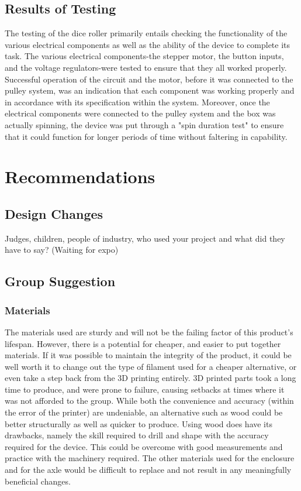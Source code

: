 \documentclass[12pt]{article}
\begin{document}
\subsection{Results of Testing}

The testing of the dice roller primarily entails checking the functionality of the various electrical components as well as the ability of the device to complete its task. The various electrical components-the stepper motor, the button inputs, and the voltage regulators-were tested to ensure that they all worked properly. Successful operation of the circuit and the motor, before it was connected to the pulley system, was an indication that each component was working properly and in accordance with its specification within the system. 
Moreover, once the electrical components were connected to the pulley system and the box was actually spinning, the device was put through a "spin duration test" to ensure that it could function for longer periods of time without faltering in capability.

\newpage
\section{Recommendations}

\subsection{Design Changes}
Judges, children, people of industry, who used your project and what did they have to say? (Waiting for expo)

\subsection{Group Suggestion}

\subsubsection{Materials}
The materials used are sturdy and will not be the failing factor of this product's lifespan. However, there is a potential for cheaper, and easier to put together materials. If it was possible to maintain the integrity of the product, it could be well worth it to change out the type of filament used for a cheaper alternative, or even take a step back from the 3D printing entirely. 3D printed parts took a long time to produce, and were prone to failure, causing setbacks at times where it was not afforded to the group. While both the convenience and accuracy (within the error of the printer) are undeniable, an alternative such as wood could be better structurally as well as quicker to produce. Using wood does have its drawbacks, namely the skill required to drill and shape with the accuracy required for the device. This could be overcome with good measurements and practice with the machinery required. The other materials used for the enclosure and for the axle would be difficult to replace and not result in any meaningfully beneficial changes.
\end{document}
